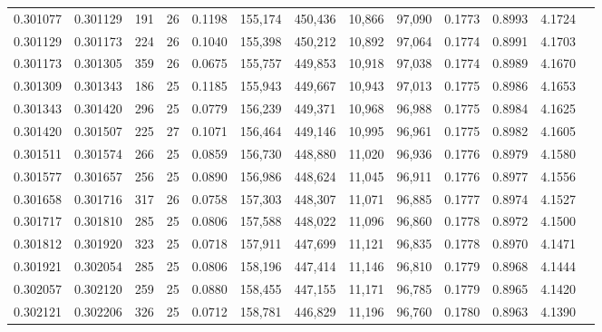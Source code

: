 \begin{tabular}{rrrrrrrrrrrrr}
0.301077 & 0.301129 &   191 &  26 &                                     0.1198 & 155,174 & 450,436 &  10,866 &  97,090 & 0.1773 & 0.8993 & 4.1724 \\
0.301129 & 0.301173 &   224 &  26 &                                     0.1040 & 155,398 & 450,212 &  10,892 &  97,064 & 0.1774 & 0.8991 & 4.1703 \\
0.301173 & 0.301305 &   359 &  26 &                                     0.0675 & 155,757 & 449,853 &  10,918 &  97,038 & 0.1774 & 0.8989 & 4.1670 \\
0.301309 & 0.301343 &   186 &  25 &                                     0.1185 & 155,943 & 449,667 &  10,943 &  97,013 & 0.1775 & 0.8986 & 4.1653 \\
0.301343 & 0.301420 &   296 &  25 &                                     0.0779 & 156,239 & 449,371 &  10,968 &  96,988 & 0.1775 & 0.8984 & 4.1625 \\
0.301420 & 0.301507 &   225 &  27 &                                     0.1071 & 156,464 & 449,146 &  10,995 &  96,961 & 0.1775 & 0.8982 & 4.1605 \\
0.301511 & 0.301574 &   266 &  25 &                                     0.0859 & 156,730 & 448,880 &  11,020 &  96,936 & 0.1776 & 0.8979 & 4.1580 \\
0.301577 & 0.301657 &   256 &  25 &                                     0.0890 & 156,986 & 448,624 &  11,045 &  96,911 & 0.1776 & 0.8977 & 4.1556 \\
0.301658 & 0.301716 &   317 &  26 &                                     0.0758 & 157,303 & 448,307 &  11,071 &  96,885 & 0.1777 & 0.8974 & 4.1527 \\
0.301717 & 0.301810 &   285 &  25 &                                     0.0806 & 157,588 & 448,022 &  11,096 &  96,860 & 0.1778 & 0.8972 & 4.1500 \\
0.301812 & 0.301920 &   323 &  25 &                                     0.0718 & 157,911 & 447,699 &  11,121 &  96,835 & 0.1778 & 0.8970 & 4.1471 \\
0.301921 & 0.302054 &   285 &  25 &                                     0.0806 & 158,196 & 447,414 &  11,146 &  96,810 & 0.1779 & 0.8968 & 4.1444 \\
0.302057 & 0.302120 &   259 &  25 &                                     0.0880 & 158,455 & 447,155 &  11,171 &  96,785 & 0.1779 & 0.8965 & 4.1420 \\
0.302121 & 0.302206 &   326 &  25 &                                     0.0712 & 158,781 & 446,829 &  11,196 &  96,760 & 0.1780 & 0.8963 & 4.1390 \\

\end{tabular}
